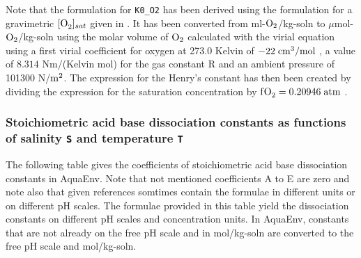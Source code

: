 \documentclass[a4paper]{article}
\begin{document}
\noindent
Note that the formulation for \texttt{K0\_O2} has been derived using the formulation for a gravimetric $[\ce{O_2}]_{sat}$ given in \citet[Weiss, 1970]{Weiss1970}. It has been converted from ml-$\rm O_2$/kg-soln to $\mu$mol-$\rm O_2$/kg-soln using the molar volume of $\rm O_2$ calculated with the virial equation using a first virial coefficient for oxygen at 273.0 Kelvin of $\rm -22 \; cm^3/mol$ \citet{Atkins1996}, a value of $8.314$ Nm/(Kelvin mol) for the gas constant R and an ambient pressure of 101300 N/$\rm m^2$. The expression for the Henry's constant has then been created by dividing the expression for the saturation concentration by $\rm f\ce{O_2} = 0.20946 \;atm$ \citep{Williams2004}.


\subsubsection{Stoichiometric acid base dissociation constants as functions of salinity \texttt{S} and temperature \texttt{T}}
The following table gives the coefficients of stoichiometric acid base dissociation constants in \textsf{AquaEnv}.  Note that not mentioned coefficients A to E are zero and note also that given references somtimes contain the formulae in different units or on different pH scales. The formulae provided in this table yield the dissociation constants on different pH scales and concentration units. In \textsf{AquaEnv}, constants that are not already on the free pH scale and in mol/kg-soln are converted to the free pH scale and mol/kg-soln.

\end{document}
